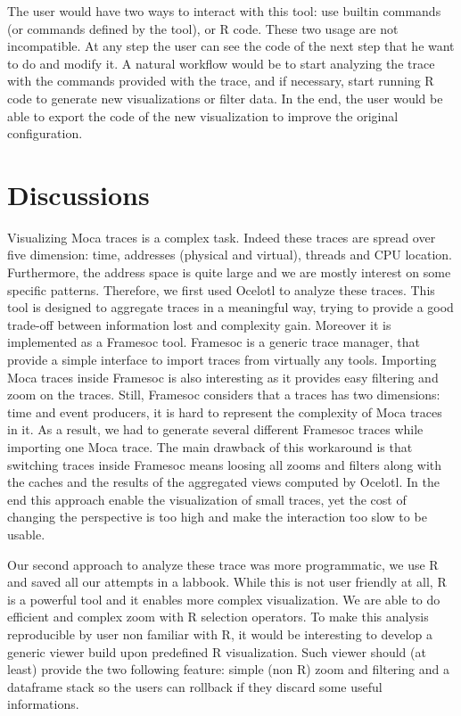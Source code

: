 The user would have two ways to interact with this tool: use builtin commands (or commands defined by the tool), or \gls{R} code.
These two usage are not incompatible.
At any step the user can see the code of the next step that he want to do and modify it.
A natural workflow would be to start analyzing the trace with the commands provided with the trace, and if necessary, start running \gls{R} code to generate new visualizations or filter data.
In the end, the user would be able to export the code of the new visualization to improve the original configuration.

\section{Discussions}
\label{sec:visu-cncl}

Visualizing \gls{Moca} traces is a complex task.
Indeed these traces are spread over five dimension: time, addresses (physical and virtual), threads and \gls{CPU} location.
Furthermore, the address space is quite large and we are mostly interest on some specific patterns.
Therefore, we first used \gls{Ocelotl} to analyze these traces.
This tool is designed to aggregate traces in a meaningful way, trying to provide a good trade-off between information lost and complexity gain.
Moreover it is implemented as a \gls{Framesoc} tool.
\gls{Framesoc} is a generic trace manager, that provide a simple interface to import traces from virtually any tools.
Importing \gls{Moca} traces inside \gls{Framesoc} is also interesting as it provides easy filtering and zoom on the traces.
Still, \gls{Framesoc} considers that a traces has two dimensions: time and event producers, it is hard to represent the complexity of \gls{Moca} traces in it.
As a result, we had to generate several different \gls{Framesoc} traces while importing one \gls{Moca} trace.
The main drawback of this workaround is that switching traces inside \gls{Framesoc} means loosing all zooms and filters along with the caches and the results of the aggregated views computed by \gls{Ocelotl}.
In the end this approach enable the visualization of small traces, yet the cost of changing the perspective is too high and make the interaction too slow to be usable.

Our second approach to analyze these trace was more programmatic, we use \gls{R} and saved all our attempts in a labbook.
While this is not user friendly at all, \gls{R} is a powerful tool and it enables more complex visualization.
We are able to do efficient and complex zoom with \gls{R} selection operators.
To make this analysis reproducible by user non familiar with \gls{R}, it would be interesting to develop a generic viewer build upon predefined \gls{R} visualization.
Such viewer should (at least) provide the two following feature: simple (non \gls{R}) zoom and filtering and a dataframe stack so the users can rollback if they discard some useful informations.

